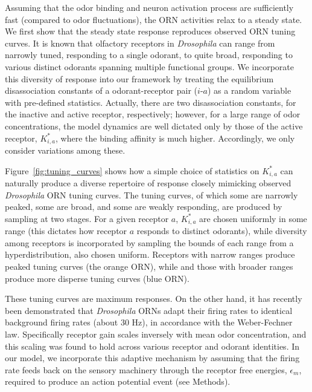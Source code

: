 Assuming that the odor binding and neuron activation process are sufficiently fast (compared to odor fluctuations), the ORN activities relax to a steady state. We first show that the steady state response reproduces observed ORN tuning curves. It is known that olfactory receptors in \textit{Drosophila} can range from narrowly tuned, responding to a single odorant, to quite broad, responding to various distinct odorants spanning multiple functional groups. We incorporate this diversity of response into our framework by treating the equilibrium disassociation constants of a odorant-receptor pair ($i$-$a$) as a random variable with pre-defined statistics. Actually, there are two disassociation constants, for the inactive and active receptor, respectively; however, for a large range of odor concentrations, the model dynamics are well dictated only by those of the active receptor, $K^*_{i, a}$, where the binding affinity is much higher. Accordingly, we only consider variations among these. 

Figure~\ref{fig:tuning_curves} shows how a simple choice of statistics on $K^*_{i, a}$ can naturally produce a diverse repertoire of response closely mimicking observed \textit{Drosophila} ORN tuning curves. The tuning curves, of which some are narrowly peaked, some are broad, and some are weakly responding, are produced by sampling at two stages. For a given receptor $a$, $K^*_{i,a}$ are chosen uniformly in some range (this dictates how receptor $a$ responds to distinct odorants), while diversity among receptors is incorporated by sampling the bounds of each range from a hyperdistribution, also chosen uniform. Receptors with narrow ranges produce peaked tuning curves (the orange ORN), while and those with broader ranges produce more disperse tuning curves (blue ORN). 


These tuning curves are maximum responses. On the other hand, it has recently been demonstrated that \textit{Drosophila} ORNs adapt their firing rates to identical background firing rates (about 30 Hz), in accordance with the Weber-Fechner law. Specifically receptor gain scales inversely with mean odor concentration, and this scaling was found to hold across various receptor and odorant identities. In our model, we incorporate this adaptive mechanism by assuming that the firing rate feeds back on the sensory machinery through the receptor free energies, $\epsilon_m$, required to produce an action potential event (see Methods). %

